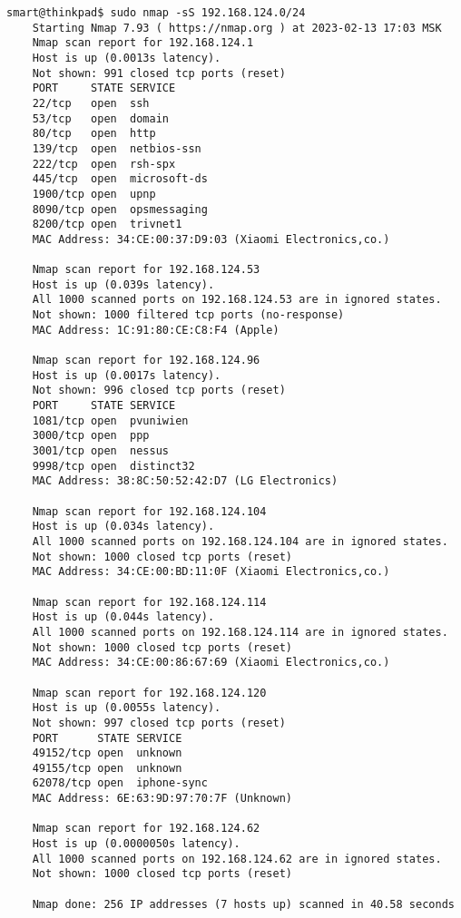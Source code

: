 \begin{Verbatim}[frame=single,breaklines=true,breakanywhere=true]
    smart@thinkpad$ sudo nmap -sS 192.168.124.0/24
    Starting Nmap 7.93 ( https://nmap.org ) at 2023-02-13 17:03 MSK
    Nmap scan report for 192.168.124.1
    Host is up (0.0013s latency).
    Not shown: 991 closed tcp ports (reset)
    PORT     STATE SERVICE
    22/tcp   open  ssh
    53/tcp   open  domain
    80/tcp   open  http
    139/tcp  open  netbios-ssn
    222/tcp  open  rsh-spx
    445/tcp  open  microsoft-ds
    1900/tcp open  upnp
    8090/tcp open  opsmessaging
    8200/tcp open  trivnet1
    MAC Address: 34:CE:00:37:D9:03 (Xiaomi Electronics,co.)

    Nmap scan report for 192.168.124.53
    Host is up (0.039s latency).
    All 1000 scanned ports on 192.168.124.53 are in ignored states.
    Not shown: 1000 filtered tcp ports (no-response)
    MAC Address: 1C:91:80:CE:C8:F4 (Apple)

    Nmap scan report for 192.168.124.96
    Host is up (0.0017s latency).
    Not shown: 996 closed tcp ports (reset)
    PORT     STATE SERVICE
    1081/tcp open  pvuniwien
    3000/tcp open  ppp
    3001/tcp open  nessus
    9998/tcp open  distinct32
    MAC Address: 38:8C:50:52:42:D7 (LG Electronics)

    Nmap scan report for 192.168.124.104
    Host is up (0.034s latency).
    All 1000 scanned ports on 192.168.124.104 are in ignored states.
    Not shown: 1000 closed tcp ports (reset)
    MAC Address: 34:CE:00:BD:11:0F (Xiaomi Electronics,co.)

    Nmap scan report for 192.168.124.114
    Host is up (0.044s latency).
    All 1000 scanned ports on 192.168.124.114 are in ignored states.
    Not shown: 1000 closed tcp ports (reset)
    MAC Address: 34:CE:00:86:67:69 (Xiaomi Electronics,co.)

    Nmap scan report for 192.168.124.120
    Host is up (0.0055s latency).
    Not shown: 997 closed tcp ports (reset)
    PORT      STATE SERVICE
    49152/tcp open  unknown
    49155/tcp open  unknown
    62078/tcp open  iphone-sync
    MAC Address: 6E:63:9D:97:70:7F (Unknown)

    Nmap scan report for 192.168.124.62
    Host is up (0.0000050s latency).
    All 1000 scanned ports on 192.168.124.62 are in ignored states.
    Not shown: 1000 closed tcp ports (reset)

    Nmap done: 256 IP addresses (7 hosts up) scanned in 40.58 seconds
\end{Verbatim}

